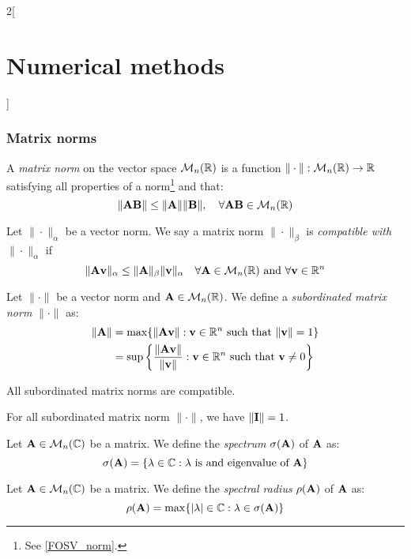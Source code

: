 \documentclass[../../../main_math.tex]{subfiles}
\begin{document}
\begin{multicols}{2}[\section{Numerical methods}]
  \subsubsection{Matrix norms}
  \begin{definition}
    A \emph{matrix norm} on the vector space $\mathcal{M}_n(\mathbb{R})$ is a function $\|\cdot\|:\mathcal{M}_n(\mathbb{R})\rightarrow\mathbb{R}$ satisfying all properties of a norm\footnote{See \cref{FOSV_norm}.} and that: $$\|\boldsymbol{\mathrm{A}}\boldsymbol{\mathrm{B}}\|\leq\|\boldsymbol{\mathrm{A}}\|\|\boldsymbol{\mathrm{B}}\|,\quad\forall \boldsymbol{\mathrm{A}}\boldsymbol{\mathrm{B}}\in\mathcal{M}_n(\mathbb{R})$$
  \end{definition}
  \begin{definition}
    Let $\|\cdot\|_\alpha$ be a vector norm. We say a matrix norm $\|\cdot\|_\beta$ is \emph{compatible with} $\|\cdot\|_\alpha$ if $$\|\boldsymbol{\mathrm{A}}\boldsymbol{\mathrm{v}}\|_\alpha\leq\|\boldsymbol{\mathrm{A}}\|_\beta\|\boldsymbol{\mathrm{v}}\|_\alpha\quad\forall\boldsymbol{\mathrm{A}}\in\mathcal{M}_n(\mathbb{R})\text{ and }\forall\boldsymbol{\mathrm{v}}\in\mathbb{R}^n$$
  \end{definition}
  \begin{definition}
    Let $\|\cdot\|$ be a vector norm and $\boldsymbol{\mathrm{A}}\in\mathcal{M}_n(\mathbb{R})$. We define a \emph{subordinated matrix norm} $\|\cdot\|$ as:
    \begin{align*}
      \|\boldsymbol{\mathrm{A}}\| & =\max\{\|\boldsymbol{\mathrm{A}}\boldsymbol{\mathrm{v}}\|:\boldsymbol{\mathrm{v}}\in\mathbb{R}^n\text{ such that }\|\boldsymbol{\mathrm{v}}\|=1\}                              \\
                 & =\sup\left\{\frac{\|\boldsymbol{\mathrm{A}}\boldsymbol{\mathrm{v}}\|}{\|\boldsymbol{\mathrm{v}}\|}:\boldsymbol{\mathrm{v}}\in\mathbb{R}^n\text{ such that }\boldsymbol{\mathrm{v}}\ne 0\right\}
    \end{align*}
  \end{definition}
  \begin{lemma}
    All subordinated matrix norms are compatible.
  \end{lemma}
  \begin{lemma}
    For all subordinated matrix norm $\|\cdot\|$, we have $\|\boldsymbol{\mathrm{I}}\|=1$.
  \end{lemma}
  \begin{definition}
    Let $\boldsymbol{\mathrm{A}}\in\mathcal{M}_n(\mathbb{C})$ be a matrix. We define the \emph{spectrum} $\sigma(\boldsymbol{\mathrm{A}})$ of $\boldsymbol{\mathrm{A}}$ as: $$\sigma(\boldsymbol{\mathrm{A}})=\{\lambda\in\mathbb{C}:\lambda\text{ is and eigenvalue of }\boldsymbol{\mathrm{A}}\}$$
  \end{definition}
  \begin{definition}
    Let $\boldsymbol{\mathrm{A}}\in\mathcal{M}_n(\mathbb{C})$ be a matrix. We define the \emph{spectral radius} $\rho(\boldsymbol{\mathrm{A}})$ of $\boldsymbol{\mathrm{A}}$ as: $$\rho(\boldsymbol{\mathrm{A}})=\max\{|\lambda|\in\mathbb{C}:\lambda\in\sigma(\boldsymbol{\mathrm{A}})\}$$
  \end{definition}

\end{multicols}
\end{document}
